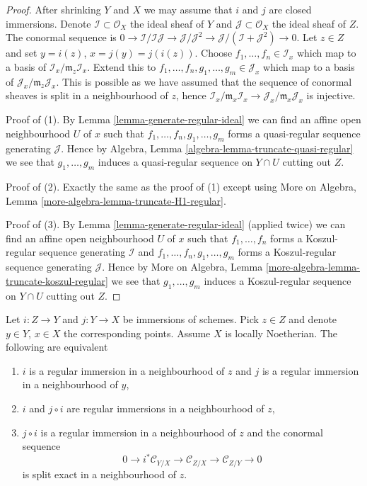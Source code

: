 \begin{proof}
After shrinking $Y$ and $X$ we may assume that $i$ and $j$ are closed
immersions. Denote $\mathcal{I} \subset \mathcal{O}_X$ the ideal sheaf
of $Y$ and $\mathcal{J} \subset \mathcal{O}_X$ the ideal sheaf of $Z$.
The conormal sequence is $0 \to \mathcal{I}/\mathcal{I}\mathcal{J}
\to \mathcal{J}/\mathcal{J}^2 \to
\mathcal{J}/(\mathcal{I} + \mathcal{J}^2) \to 0$.
Let $z \in Z$ and set $y = i(z)$, $x = j(y) = j(i(z))$.
Choose $f_1, \ldots, f_n \in \mathcal{I}_x$ which map to a basis of
$\mathcal{I}_x/\mathfrak m_z\mathcal{I}_x$. Extend this to
$f_1, \ldots, f_n, g_1, \ldots, g_m \in \mathcal{J}_x$
which map to a basis of $\mathcal{J}_x/\mathfrak m_z\mathcal{J}_x$.
This is possible as we have assumed that the sequence of conormal
sheaves is split in a neighbourhood of $z$, hence
$\mathcal{I}_x/\mathfrak m_x\mathcal{I}_x \to
\mathcal{J}_x/\mathfrak m_x\mathcal{J}_x$ is injective.

\medskip\noindent
Proof of (1). By
Lemma \ref{lemma-generate-regular-ideal}
we can find an affine open neighbourhood $U$ of $x$ such that
$f_1, \ldots, f_n, g_1, \ldots, g_m$ forms a quasi-regular sequence
generating $\mathcal{J}$. Hence by
Algebra, Lemma \ref{algebra-lemma-truncate-quasi-regular}
we see that $g_1, \ldots, g_m$ induces a quasi-regular sequence on
$Y \cap U$ cutting out $Z$.

\medskip\noindent
Proof of (2). Exactly the same as the proof of (1) except using
More on Algebra, Lemma \ref{more-algebra-lemma-truncate-H1-regular}.

\medskip\noindent
Proof of (3). By
Lemma \ref{lemma-generate-regular-ideal}
(applied twice)
we can find an affine open neighbourhood $U$ of $x$ such that
$f_1, \ldots, f_n$ forms a Koszul-regular sequence generating
$\mathcal{I}$ and $f_1, \ldots, f_n, g_1, \ldots, g_m$ forms a
Koszul-regular sequence generating $\mathcal{J}$. Hence by
More on Algebra, Lemma \ref{more-algebra-lemma-truncate-koszul-regular}
we see that $g_1, \ldots, g_m$ induces a Koszul-regular sequence on
$Y \cap U$ cutting out $Z$.
\end{proof}

\begin{lemma}
\label{lemma-extra-permanence-regular-immersion-noetherian}
Let $i : Z \to Y$ and $j : Y \to X$ be immersions of schemes.
Pick $z \in Z$ and denote $y \in Y$, $x \in X$ the corresponding points.
Assume $X$ is locally Noetherian.
The following are equivalent
\begin{enumerate}
\item $i$ is a regular immersion in a neighbourhood of $z$ and $j$
is a regular immersion in a neighbourhood of $y$,
\item $i$ and $j \circ i$ are regular immersions in a neighbourhood of $z$,
\item $j \circ i$ is a regular immersion in a neighbourhood of $z$ and the
conormal sequence
$$
0 \to i^*\mathcal{C}_{Y/X} \to
\mathcal{C}_{Z/X} \to
\mathcal{C}_{Z/Y} \to 0
$$
is split exact in a neighbourhood of $z$.
\end{enumerate}
\end{lemma}

